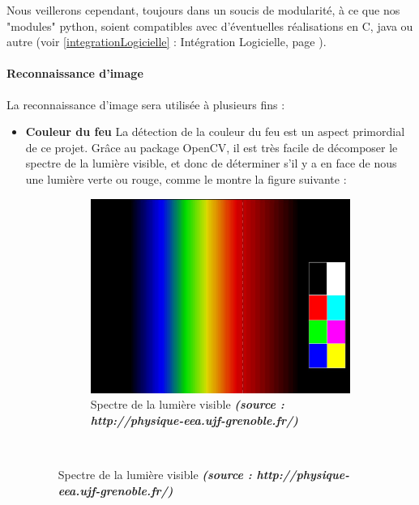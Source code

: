 			Nous veillerons cependant, toujours dans un soucis de modularité, à ce que nos "modules" python, soient compatibles avec d'éventuelles réalisations en C, java ou autre (voir \ref{integrationLogicielle} : Intégration Logicielle, page \pageref{integrationLogicielle}).

		\paragraph{Reconnaissance d'image}
			

			La reconnaissance d'image sera utilisée à plusieurs fins :
			\begin{itemize}
				\item \textbf{Couleur du feu}
					La détection de la couleur du feu est un aspect primordial de ce projet. Grâce au package OpenCV, il est très facile de décomposer le spectre de la lumière visible, et donc de déterminer s'il y a en face de nous une lumière verte ou rouge, comme le montre la figure suivante :
					\begin{figure}[H]
					    \centering
					    \begin{subfigure}[h]{0.5\textwidth}
					        \includegraphics[width=\textwidth]{Graphics/opencvEtalon.jpg}
					        \caption{Spectre de la lumière visible \textit{\textbf{(source : http://physique-eea.ujf-grenoble.fr/)}}}
					    \end{subfigure}\\


\end{figure}
\end{itemize}
